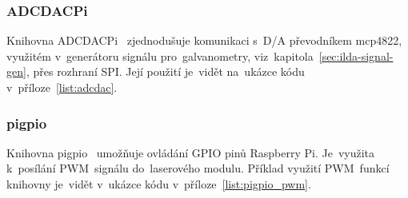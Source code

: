 \subsubsection{ADCDACPi}
Knihovna ADCDACPi~\cite{ADCDACPi} zjednodušuje komunikaci s~D/A převodníkem mcp4822, využitém v~generátoru signálu pro~galvanometry, viz~kapitola~\ref{sec:ilda-signal-gen}, přes rozhraní SPI. Její použití je~vidět na~ukázce kódu v~příloze~\ref{list:adcdac}.

\subsubsection{pigpio}\label{sec:ls_pigpio}
Knihovna pigpio~\cite{pigpio} umožňuje ovládání GPIO pinů Raspberry Pi. Je~využita k~posílání PWM~signálu do~laserového modulu. Příklad využití PWM~funkcí knihovny je~vidět v~ukázce kódu v~příloze~\ref{list:pigpio_pwm}.

